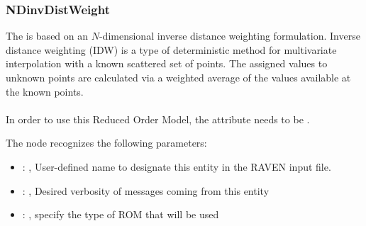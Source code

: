 \subsubsection{NDinvDistWeight}
  The  is based on an                             $N$-dimensional inverse
  distance weighting formulation.                             Inverse distance weighting (IDW) is a
  type of deterministic method for                             multivariate interpolation with a
  known scattered set of points.                             The assigned values to unknown points
  are calculated via a weighted average of                             the values available at the
  known points.                             \\
                               \\
  In order to use this Reduced Order Model, the  attribute
   needs to be .

  The  node recognizes the following parameters:
    \begin{itemize}
      \item {}: , 
        User-defined name to designate this entity in the RAVEN input file.
      \item {}: , 
        Desired verbosity of messages coming from this entity
      \item {}: , 
        specify the type of ROM that will be used
  \end{itemize}

